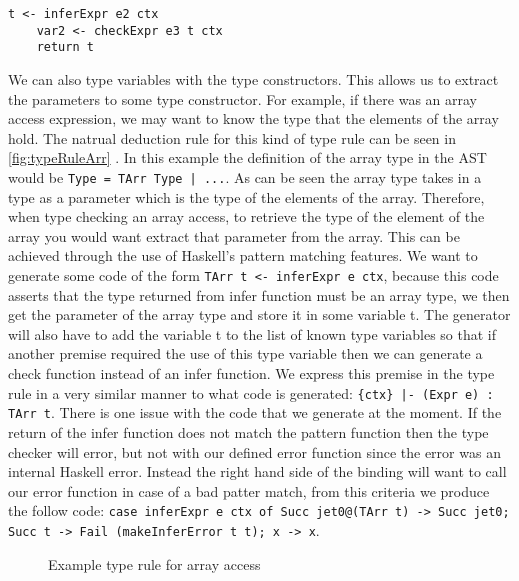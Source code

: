 \begin{lstlisting}[caption = Code generated for type variables in inferExpr from TExprIf, label=lst:codeTExprIfInfer]
    t <- inferExpr e2 ctx
    var2 <- checkExpr e3 t ctx
    return t
\end{lstlisting}

We can also type variables with the type constructors.
This allows us to extract the parameters to some type constructor.
For example, if there was an array access expression, we may want to know the type that the elements of the array hold.
The natrual deduction rule for this kind of type rule can be seen in \autoref{fig:typeRuleArr} .
In this example the definition of the array type in the AST would be \texttt{Type = TArr Type | ...}.
As can be seen the array type takes in a type as a parameter which is the type of the elements of the array.
Therefore, when type checking an array access, to retrieve the type of the element of the array you would want extract that parameter from the array.
This can be achieved through the use of Haskell's pattern matching features.
We want to generate some code of the form \texttt{TArr t <- inferExpr e ctx}, because this code asserts that the type returned from infer function must be an array type, we then get the parameter of the array type and store it in some variable t.
The generator will also have to add the variable t to the list of known type variables so that if another premise required the use of this type variable then we can generate a check function instead of an infer function.
We express this premise in the type rule in a very similar manner to what code is generated:
\texttt{\{ctx\} |- (Expr e) : TArr t}.
There is one issue with the code that we generate at the moment.
If the return of the infer function does not match the pattern function then the type checker will error, but not with our defined error function since the error was an internal Haskell error.
Instead the right hand side of the binding will want to call our error function in case of a bad patter match, from this criteria we produce the follow code: \texttt{case inferExpr e ctx of Succ jet0@(TArr t) -> Succ jet0; Succ t -> Fail (makeInferError t t); x -> x}.

\begin{figure}[t]
    \centering
    \begin{prooftree}
    \end{prooftree}
    \caption{Example type rule for array access}
    \label{fig:typeRuleArr}
\end{figure}

